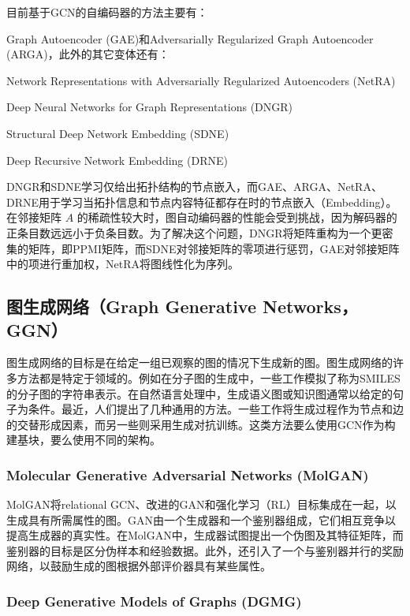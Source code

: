 \documentclass[UTF8]{ctexart}
\begin{document}
目前基于GCN的自编码器的方法主要有：\par Graph Autoencoder (GAE)和Adversarially Regularized Graph Autoencoder (ARGA)，此外的其它变体还有： \par

Network Representations with Adversarially Regularized Autoencoders (NetRA) \par

Deep Neural Networks for Graph Representations (DNGR) \par

Structural Deep Network Embedding (SDNE) \par

Deep Recursive Network Embedding (DRNE) \par

DNGR和SDNE学习仅给出拓扑结构的节点嵌入，而GAE、ARGA、NetRA、DRNE用于学习当拓扑信息和节点内容特征都存在时的节点嵌入（Embedding）。在邻接矩阵 $A$ 的稀疏性较大时，图自动编码器的性能会受到挑战，因为解码器的正条目数远远小于负条目数。为了解决这个问题，DNGR将矩阵重构为一个更密集的矩阵，即PPMI矩阵，而SDNE对邻接矩阵的零项进行惩罚，GAE对邻接矩阵中的项进行重加权，NetRA将图线性化为序列。

\subsection{图生成网络（Graph Generative Networks，GGN）}

图生成网络的目标是在给定一组已观察的图的情况下生成新的图。图生成网络的许多方法都是特定于领域的。例如在分子图的生成中，一些工作模拟了称为SMILES的分子图的字符串表示。在自然语言处理中，生成语义图或知识图通常以给定的句子为条件。最近，人们提出了几种通用的方法。一些工作将生成过程作为节点和边的交替形成因素，而另一些则采用生成对抗训练。这类方法要么使用GCN作为构建基块，要么使用不同的架构。

\subsubsection{Molecular Generative Adversarial Networks (MolGAN)}

MolGAN将relational GCN、改进的GAN和强化学习（RL）目标集成在一起，以生成具有所需属性的图。GAN由一个生成器和一个鉴别器组成，它们相互竞争以提高生成器的真实性。在MolGAN中，生成器试图提出一个伪图及其特征矩阵，而鉴别器的目标是区分伪样本和经验数据。此外，还引入了一个与鉴别器并行的奖励网络，以鼓励生成的图根据外部评价器具有某些属性。

\subsubsection{Deep Generative Models of Graphs (DGMG)}
\end{document}
